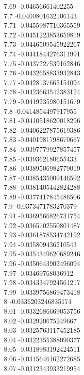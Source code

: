 {7.69	-0.04656661402255\\
7.7	-0.0460801632106143\\
7.71	-0.0455987710365559\\
7.72	-0.0451223853659819\\
7.73	-0.0446509545922267\\
7.74	-0.0441844276311991\\
7.75	-0.0437227539162846\\
7.76	-0.0432658833932843\\
7.77	-0.0428137665154094\\
7.78	-0.0423663542383124\\
7.79	-0.0419235980151679\\
7.8	-0.0414854497917955\\
7.81	-0.0410518620018296\\
7.82	-0.0406227875619386\\
7.83	-0.0401981798670667\\
7.84	-0.0397779927857457\\
7.85	-0.039362180655433\\
7.86	-0.0389506982779019\\
7.87	-0.0385435009146592\\
7.88	-0.0381405442824288\\
7.89	-0.0377417845486506\\
7.9	-0.0373471783270379\\
7.91	-0.0369566826731754\\
7.92	-0.0365702550801487\\
7.93	-0.0361878534742192\\
7.94	-0.035809436210543\\
7.95	-0.0354349620689246\\
7.96	-0.0350643902496094\\
7.97	-0.03469768036912\\
7.98	-0.0343347924561217\\
7.99	-0.0339756869473418\\
8	-0.0336203246835174\\
8.01	-0.0332686669053756\\
8.02	-0.032920675249667\\
8.03	-0.0325763117452185\\
8.04	-0.0322355388090377\\
8.05	-0.0318983192424511\\
8.06	-0.0315646162272685\\
8.07	-0.0312343933219954\\
}
